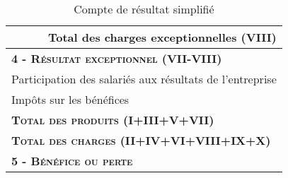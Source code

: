\begin{table}[h]
\begin{tabular}{|l|p{6.5cm}|}
                                                                                              & \multicolumn{1}{r|}{Total des charges exceptionnelles (VIII)}       \\                                                                                   
\hline
 \multicolumn{2}{|l|}{\hspace{1em} \textbf{\textsc{4 - Résultat exceptionnel (VII-VIII)}}}   \\
\hline
 \multicolumn{2}{|l|}{Participation des salariés aux résultats de l'entreprise}              \\
\hline
 \multicolumn{2}{|l|}{Impôts sur les bénéfices}                                              \\
\hline
 \multicolumn{2}{|l|}{\hspace{2em}\textbf{\textsc{Total des produits (I+III+V+VII)}}}        \\
\hline
 \multicolumn{2}{|l|}{\hspace{2em}\textbf{\textsc{Total des charges (II+IV+VI+VIII+IX+X)}}}  \\
\hline
 \multicolumn{2}{|l|}{\hspace{1em} \textbf{\textsc{5 - Bénéfice ou perte}}}                  \\
\hline
\end{tabular}
\label{compteResultatPage2}
\caption{Compte de résultat simplifié}
\end{table}